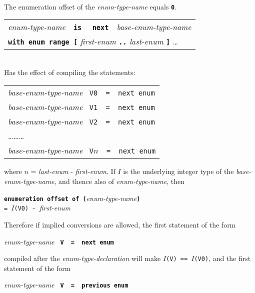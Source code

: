 \documentclass[12pt]{article}
\newcommand{\TT}[1]{{\tt \bfseries #1}}
\newcommand{\STAR}{{\Large $^\star$}}
\newenvironment{indpar}[1][0.3in]%
	{\begin{list}{}%
		     {\setlength{\itemsep}{0in}%
		      \setlength{\topsep}{0in}%
		      \setlength{\parsep}{1ex}%
		      \setlength{\labelwidth}{#1}%
		      \setlength{\leftmargin}{#1}%
		      \addtolength{\leftmargin}{\labelsep}}%
	 \item}%
	{\end{list}}
\newenvironment{itemlist}[1][0.5in]%
	{\begin{list}{}{\setlength{\labelwidth}{#1}%
	                \setlength{\leftmargin}{#1}%
		        \addtolength{\leftmargin}{\labelsep}}}%
	{\end{list}}
\begin{document}
\begin{indpar}
\begin{itemlist}
\item[\TT{type} {\em qualifier-name}\STAR{} {\em enum-type-name}~~%
    \TT{is}~~{\em builtin-integer-type-name} \ldots{}] ~\\
The enumeration offset of the {\em enum-type-name} equals \TT{0}.
\item[\TT{type} {\em qualifier-name}\STAR{}]
              \begin{tabular}[t]{@{}l@{}}
              {\em enum-type-name}~~\TT{is}~~%
              \TT{next}~~{\em base-enum-type-name} \\
	      \TT{with enum range [}
	         {\em first-enum} \TT{..} {\em last-enum} \TT{]} \ldots{} \\
	      \end{tabular} \\
Has the effect of compiling the statements:
\begin{center}
\begin{tabular}{l}
{\em base-enum-type-name} {\tt ~V0~~=~~next enum} \\
{\em base-enum-type-name} {\tt ~V1~~=~~next enum} \\
{\em base-enum-type-name} {\tt ~V2~~=~~next enum} \\
\ldots\ldots\ldots \\
{\em base-enum-type-name} {\tt ~V$n$~~=~~next enum} \\
\end{tabular}
\end{center}
where $n$ = {\em last-enum} - {\em first-enum}.
If $I$ is the underlying integer type of the {\em base-enum-type-name},
and thence also of {\em enum-type-name}, then
\begin{center}
\TT{enumeration offset of (}{\em enum-type-name}\TT{)} \\
{\tt =~$I$(V0)~-~}{\em first-enum}
\end{center}
Therefore if implied conversions are allowed, the first statement of the form
\begin{center}
{\em enum-type-name} \TT{~V~~=~~next enum} \\
\end{center}
compiled after the {\em enum-type-declaration} will make
{\tt $I$(V) == $I$(V0)}, and the first statement of the form
\begin{center}
{\em enum-type-name} \TT{~V~~=~~previous enum} \\
\end{center}

\end{itemlist}
\end{indpar}
\end{document}
